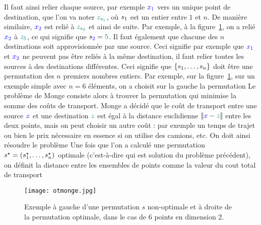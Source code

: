 Il faut ainsi relier chaque source, par exemple $\myblue{x_1}$ vers un unique point de destination, que l'on va noter $\mylblue{z_{\perm{1}}}$, où $s_{1}$ est un entier entre $1$ et $n$. De manière similaire, ${\color{blue}x_2}$ est relié à $\mylblue{z_{\perm{2}}}$ et ainsi de suite. Par exemple, à la figure~\ref{fig:otmonge}, on a relié $\myblue{x_2}$ à $\mylblue{z_5}$, ce qui signifie que $\perm{\myblue{2}}=\mylblue{5}$.
%
Il faut également que chacune des $n$ destinations soit approvisionnée par une source. Ceci signifie par exemple que ${\color{blue}x_1}$ et ${\color{blue}x_2}$ ne peuvent pas être reliés à la même destination, il faut relier toutes les sources à des destinations différentes. Ceci signifie que $\{s_{1},\ldots,s_{n}\}$ doit être une permutation des $n$ premiers nombres entiers. 
%
Par exemple, sur la figure~\ref{fig:otmonge}, sur un exemple simple avec $n=6$ éléments, on a choisit sur la gauche la permutation 
%
Le problème de Monge consiste alors à trouver la permutation qui minimise la somme des coûts de transport. Monge a décidé que le coût de transport entre une source $\myblue{x}$ et une destination $\mylblue{z}$ est égal à la distance euclidienne $\norm{\myblue{x} - \mylblue{z}}$ entre les deux points, mais on peut choisir un autre coût : par exemple un temps de trajet ou bien le prix nécessaire en essence si on utilise des camions, etc. On doit ainsi résoudre le problème 
Une fois que l'on a calculé une permutation $s^\star=(s_{1}^\star,\ldots,s_{n}^\star)$ optimale (c'est-à-dire qui est solution du problème précédent), on définit la distance entre les ensembles de points comme la valeur du cout total de transport

\begin{figure}\centering
	\texttt{[image: otmonge.jpg]}
\caption{\label{fig:otmonge} Exemple à gauche d'une permutation $s$ non-optimale et à droite de la permutation optimale, dans le cas de $6$ points en dimension 2.  }
\end{figure}

